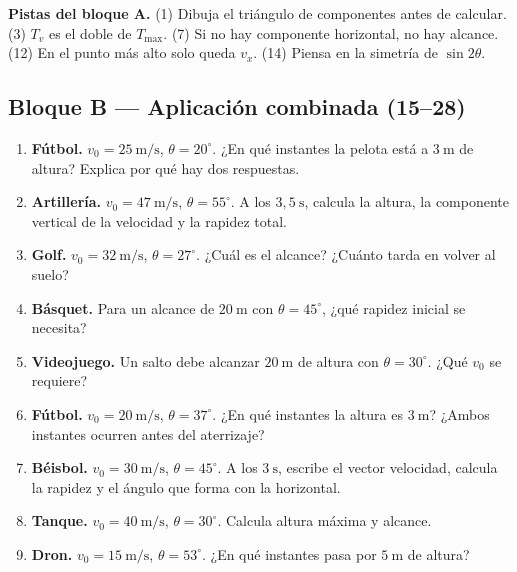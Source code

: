 \documentclass[12pt, letterpaper]{article}
\providecommand{\sen}{\sin}
\begin{document}
\begin{cuadroextra}
  \small
  \textbf{Pistas del bloque A.} (1) Dibuja el triángulo de componentes antes
  de calcular. (3) $T_v$ es el doble de $T_{\max}$. (7) Si no hay componente
  horizontal, no hay alcance. (12) En el punto más alto solo queda $v_x$.
  (14) Piensa en la simetría de $\sen2\theta$.
\end{cuadroextra}

\subsection*{Bloque B — Aplicación combinada \medio\hspace{0.7em}(15--28)}

\begin{enumerate}[leftmargin=*, label=\textbf{\arabic*.}, start=15]
  \item \textbf{Fútbol.} $v_0=25\ \text{m/s}$, $\theta=20^\circ$. ¿En qué
        instantes la pelota está a $3\ \text{m}$ de altura? Explica por qué
        hay dos respuestas.
  \item \textbf{Artillería.} $v_0=47\ \text{m/s}$, $\theta=55^\circ$. A los
        $3{,}5\ \text{s}$, calcula la altura, la componente vertical de la
        velocidad y la rapidez total.
  \item \textbf{Golf.} $v_0=32\ \text{m/s}$, $\theta=27^\circ$. ¿Cuál es el
        alcance? ¿Cuánto tarda en volver al suelo?
  \item \textbf{Básquet.} Para un alcance de $20\ \text{m}$ con
        $\theta=45^\circ$, ¿qué rapidez inicial se necesita?
  \item \textbf{Videojuego.} Un salto debe alcanzar $20\ \text{m}$ de altura
        con $\theta=30^\circ$. ¿Qué $v_0$ se requiere?
  \item \textbf{Fútbol.} $v_0=20\ \text{m/s}$, $\theta=37^\circ$. ¿En qué
        instantes la altura es $3\ \text{m}$? ¿Ambos instantes ocurren antes
        del aterrizaje?
  \item \textbf{Béisbol.} $v_0=30\ \text{m/s}$, $\theta=45^\circ$. A los
        $3\ \text{s}$, escribe el vector velocidad, calcula la rapidez y el
        ángulo que forma con la horizontal.
  \item \textbf{Tanque.} $v_0=40\ \text{m/s}$, $\theta=30^\circ$. Calcula
        altura máxima y alcance.
  \item \textbf{Dron.} $v_0=15\ \text{m/s}$, $\theta=53^\circ$. ¿En qué
        instantes pasa por $5\ \text{m}$ de altura?

\end{enumerate}
\end{document}
